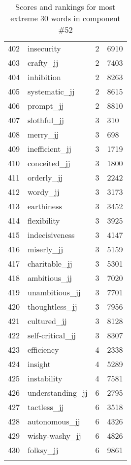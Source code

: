 \begin{longtable}[!htbp]{| rlr@{.}l |}
    402 & insecurity & 2 & 6910 \\
    403 & crafty\_jj & 2 & 7403 \\
    404 & inhibition & 2 & 8263 \\
    405 & systematic\_jj & 2 & 8615 \\
    406 & prompt\_jj & 2 & 8810 \\
    407 & slothful\_jj & 3 & 310 \\
    408 & merry\_jj & 3 & 698 \\
    409 & inefficient\_jj & 3 & 1719 \\
    410 & conceited\_jj & 3 & 1800 \\
    411 & orderly\_jj & 3 & 2242 \\
    412 & wordy\_jj & 3 & 3173 \\
    413 & earthiness & 3 & 3452 \\
    414 & flexibility & 3 & 3925 \\
    415 & indecisiveness & 3 & 4147 \\
    416 & miserly\_jj & 3 & 5159 \\
    417 & charitable\_jj & 3 & 5301 \\
    418 & ambitious\_jj & 3 & 7020 \\
    419 & unambitious\_jj & 3 & 7701 \\
    420 & thoughtless\_jj & 3 & 7956 \\
    421 & cultured\_jj & 3 & 8128 \\
    422 & self-critical\_jj & 3 & 8307 \\
    423 & efficiency & 4 & 2338 \\
    424 & insight & 4 & 5289 \\
    425 & instability & 4 & 7581 \\
    426 & understanding\_jj & 6 & 2795 \\
    427 & tactless\_jj & 6 & 3518 \\
    428 & autonomous\_jj & 6 & 4326 \\
    429 & wishy-washy\_jj & 6 & 4826 \\
    430 & folksy\_jj & 6 & 9861 \\
    \hline
    \caption{Scores and rankings for most extreme 30 words in component \#52} \\
\end{longtable}
